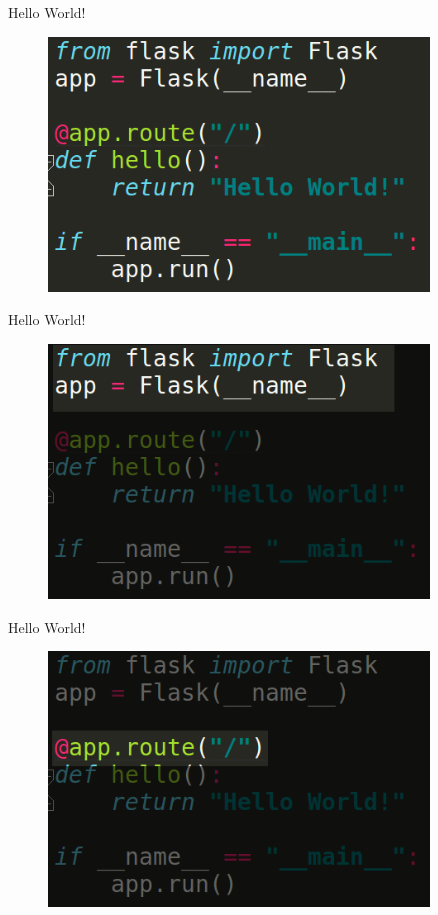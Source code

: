 \documentclass{beamer}
\begin{document}
\begin{frame}{Hello World!}

\begin{figure}[h]
\includegraphics[width=0.9\textwidth]{flask}
\end{figure}

\end{frame}
\begin{frame}{Hello World!}

\begin{figure}[h]
\includegraphics[width=0.9\textwidth]{flask1}
\end{figure}

\end{frame}
\begin{frame}{Hello World!}

\begin{figure}[h]
\includegraphics[width=0.9\textwidth]{flask2}
\end{figure}

\end{frame}
\end{document}
